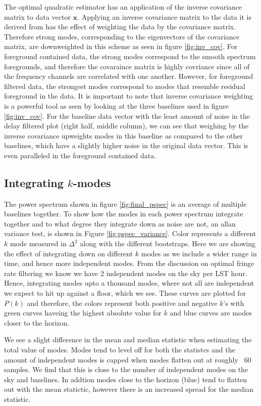 \documentclass[twocolumn,numberedappendix]{emulateapj} \shorttitle{PSA64}
\newcommand{\x}{\mathbf{x}} \newcommand{\xhat}{\hat{\mathbf{x}}}
\begin{document}
The optimal quadratic estimator has an application of the inverse covariance
matrix to data vector $\x$. Applying an inverse covariance matrix to the data it
is derived from has the effect of weighting the data by the covariance matrix.
Therefore strong modes, corresponding to the eigenvectors of the covariance
matrix, are downweighted in this scheme as seen in figure \ref{fig:inv_cov}.
For foreground contained data, the strong modes correspond to the smooth
spectrum foregrounds, and therefore the covaraince matrix is highly covriance
since all of the frequency channels are correlated with one another. However,
for foreground filtered data, the strongest modes correspond to modes that
resemble residual foreground in the data. It is important to note that inverse
covariance weighting is a powerful tool as seen by looking at the three
baselines used in figure \ref{fig:inv_cov}. For the baseline data vector with
the least amount of noise in the delay filtered plot (right half, middle
column), we can see that weighing by the inverse covariance upweights modes in
this baseline as compared to the other baselines, which have a slightly higher
noise in the original data vector. This is even paralleled in the foreground
contained data.

\subsection{Integrating $k$-modes}
The power spectrum shown in figure \ref{fig:final_pspec} is an average of
multiple baselines together. To show how the modes in each power spectrum
integrate together and to what degree they integrate down as noise are not, an
allan variance test, is shown in Figure \ref{fig:pspec_variance}. Color
represents a different $k$ mode measured in $\Delta^{2}$ along with the
different bootstraps. Here we are showing the effect of integrating down on
different $k$ modes as we include a wider range in time, and hence more
independent modes. From the discussion on optimal fringe rate filtering we know
we have 2 independent modes on the sky per LST hour. Hence, integrating modes
upto a thousand modes, where not all are independent we expect to hit up against
a floor, which we see. These curves are plotted for $P(k)$ and therefore, the
colors represent both positive and negative $k$'s with green curves haveing the
highest absolute value for $k$ and blue curves are modes closer to the horizon.


We see a slight difference in the mean and median statistic when estimating the
total value of modes. Modes tend to level off for both the statistcs and the
amount of independent modes is capped when modes flatten out at roughly ~60
samples. We find that this is close to the number of independent modes on the
sky and baselines. In addtion modes close to the horizon (blue) tend to flatten
out with the mean statictic, however there is an increased spread for the median
statistic. 
\end{document}

